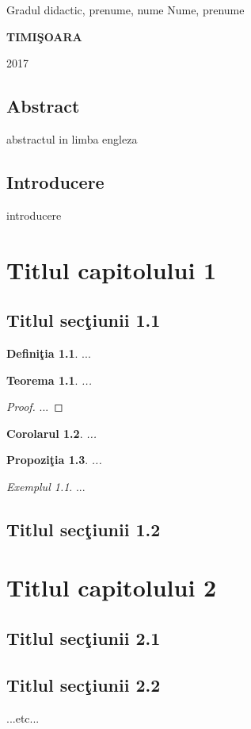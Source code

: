 \documentclass[12pt,a4paper]{report}
\newtheorem{thm}{Teorema}[section]
\newtheorem{cor}[thm]{Corolarul}
\newtheorem{prop}[thm]{Propozi\c tia}
\theoremstyle{definition}
\newtheorem{defn}{Defini\c tia}[section]
\theoremstyle{remark}
\newtheorem{exmp}{Exemplul}[section]
\begin{document}
{\large{}

\noindent Gradul didactic, prenume, nume \hspace{73pt} Nume, prenume}

\vspace{160pt}
\begin{center}
{\bf TIMI\c SOARA

2017}
\end{center}
\newpage
\normalsize{}
\section*{Abstract}
 abstractul in limba engleza
\tableofcontents
\newpage
\section*{Introducere}

introducere
\chapter{Titlul capitolului 1}
\section{Titlul sec\c tiunii 1.1}
\begin{defn} ...
\end{defn}
\begin{thm} ...
\end{thm}
\begin{proof} ...
\end{proof}
\begin{cor} ...
\end{cor}
\begin{prop} ...
\end{prop}
\begin{exmp} ...
\end{exmp}

\section{Titlul sec\c tiunii 1.2}
\chapter{Titlul capitolului 2}
\section{Titlul sec\c tiunii 2.1}
\section{Titlul sec\c tiunii 2.2}
...etc...
\begin{thebibliography}{99}
\end{thebibliography}
\end{document}
